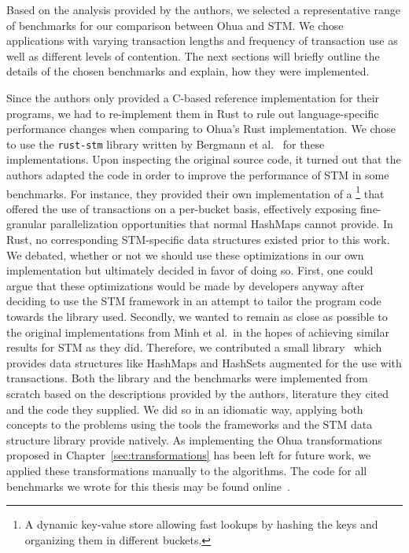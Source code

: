 Based on the analysis provided by the authors, we selected a representative range of benchmarks for our comparison between Ohua and STM.
We chose applications with varying transaction lengths and frequency of transaction use as well as different levels of contention.
The next sections will briefly outline the details of the chosen benchmarks and explain, how they were implemented.


Since the authors only provided a C-based reference implementation for their programs, we had to re-implement them in Rust to rule out language-specific performance changes when comparing to Ohua's Rust implementation.
We chose to use the \texttt{rust-stm} library written by Bergmann et al.~\cite{bergmann2020stm} for these implementations.
Upon inspecting the original source code, it turned out that the authors adapted the code in order to improve the performance of STM in some benchmarks.
For instance, they provided their own implementation of a \footnote{A dynamic key-value store allowing fast lookups by hashing the keys and organizing them in different buckets.} that offered the use of transactions on a per-bucket basis, effectively exposing fine-granular parallelization opportunities that normal HashMaps cannot provide.
In Rust, no corresponding STM-specific data structures existed prior to this work.
We debated, whether or not we should use these optimizations in our own implementation but ultimately decided in favor of doing so.
First, one could argue that these optimizations would be made by developers anyway after deciding to use the STM framework in an attempt to tailor the program code towards the library used.
Secondly, we wanted to remain as close as possible to the original implementations from Minh et al.\ in the hopes of achieving similar results for STM as they did.
Therefore, we contributed a small library~\cite{wittwer2020stmdata} which provides data structures like HashMaps and HashSets augmented for the use with transactions.
Both the library and the benchmarks were implemented from scratch based on the descriptions provided by the authors, literature they cited and the code they supplied.
We did so in an idiomatic way, applying both concepts to the problems using the tools the frameworks and the STM data structure library provide natively.
As implementing the Ohua transformations proposed in Chapter~\ref{sec:transformations} has been left for future work, we applied these transformations manually to the algorithms.
The code for all benchmarks we wrote for this thesis may be found online~\cite{wittwer2020benchmarks}.

